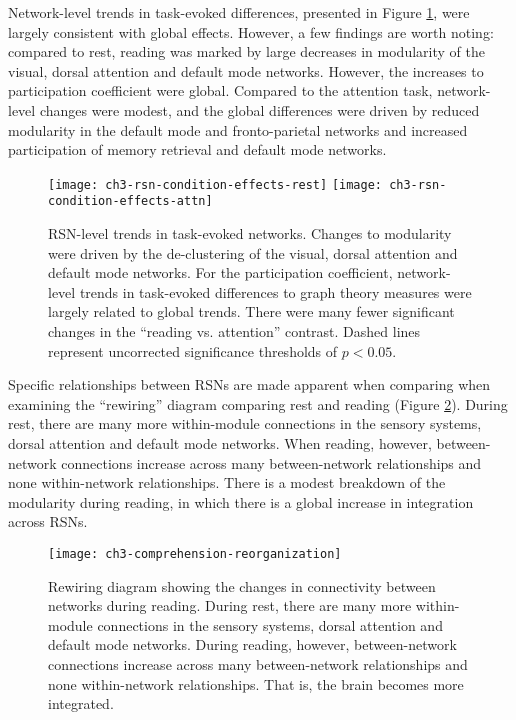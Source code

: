 Network-level trends in task-evoked differences, presented in Figure \ref{fig:ch3-rsn-condition-effects}, were largely consistent with global effects. However, a few findings are worth noting: compared to rest, reading was marked by large decreases in modularity of the visual, dorsal attention and default mode networks. However, the increases to participation coefficient were global. Compared to the attention task, network-level changes were modest, and the global differences were driven by reduced modularity in the default mode and fronto-parietal networks and increased participation of memory retrieval and default mode networks.

\begin{figure}[t!]
	\centering
	\texttt{[image: ch3-rsn-condition-effects-rest]}
	\texttt{[image: ch3-rsn-condition-effects-attn]}
    \caption[RSN-level trends in task-evoked networks.]{RSN-level trends in task-evoked networks. Changes to modularity were driven by the de-clustering of the visual, dorsal attention and default mode networks. For the participation coefficient, network-level trends in task-evoked differences to graph theory measures were largely related to global trends. There were many fewer significant changes in the ``reading vs. attention'' contrast. Dashed lines represent uncorrected significance thresholds of $p < 0.05$.}
	\label{fig:ch3-rsn-condition-effects}
\end{figure}

Specific relationships between RSNs are made apparent when comparing when examining the ``rewiring'' diagram comparing rest and reading (Figure \ref{fig:ch3-comprehension-reorganization}). During rest, there are many more within-module connections in the sensory systems, dorsal attention and default mode networks. When reading, however, between-network connections increase across many between-network relationships and none within-network relationships. There is a modest breakdown of the modularity during reading, in which there is a global increase in integration across RSNs.

\begin{figure}[t!]
	\centering
	\texttt{[image: ch3-comprehension-reorganization]}
    \caption[Rewiring of RSNs during reading.]{Rewiring diagram showing the changes in connectivity between networks during reading. During rest, there are many more within-module connections in the sensory systems, dorsal attention and default mode networks. During reading, however, between-network connections increase across many between-network relationships and none within-network relationships. That is, the brain becomes more integrated.}
	\label{fig:ch3-comprehension-reorganization}
\end{figure}

